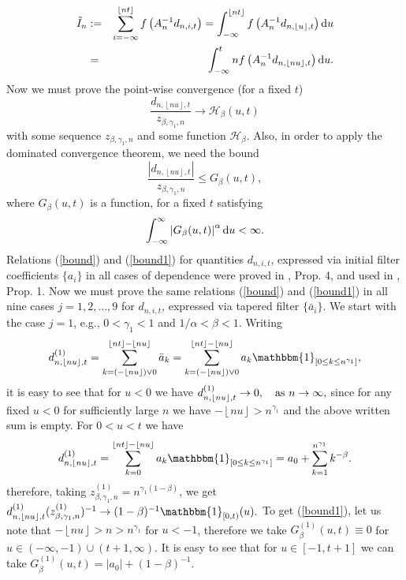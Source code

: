 \documentclass[12pt]{article}
\def\a{\alpha}
\def\b{\beta}
\def\g{\gamma}
\def\H{{\mathscr H}}
\newcommand{\dd}{{\rm d}}
\newcommand{\abs}[1]{\left|#1\right|}
\newcommand{\ind}[1]{\mathbbm{1}_{#1}}
\newcommand{\sv}[1]{\left\lfloor #1 \right\rfloor}
\theoremstyle{plain}
\theoremstyle{definition}
\begin{document}
\begin{eqnarray}\label{In1}
{\tilde I}_n &:=& \sum_{i=-\infty}^{\sv{nt}}f\left( A_{n}^{-1}d_{n, i, t}  \right)=\int_{-\infty}^{\sv{nt}}f\left( A_{n}^{-1}d_{n, \sv{u}, t}  \right)\dd u  \\ \nonumber
   &=& \int_{-\infty}^{t}n f\left( A_{n}^{-1}d_{n, \sv{nu}, t}  \right)\dd u.
\end{eqnarray}
Now we must prove the point-wise convergence (for a fixed $t$)
\begin{equation}\label{bound}
\frac{d_{n, \sv{nu}, t} }{z_{\b,\g_1, n}}\rightarrow \H_{\b}(u,t)
\end{equation}
with some sequence $z_{\b, \g_1, n}$ and some function $\H_\b$. Also, in order to apply the dominated convergence theorem, we need the bound
\begin{equation}\label{bound1}
\frac{|d_{n, \sv{nu}, t} |}{z_{\b, \g_1, n}}\leq  G_{\b}(u,t),
\end{equation}
where $G_{\b}(u,t)$ is a function, for a fixed $t$ satisfying
\begin{equation*}\label{integrableBound}
\int_{-\infty}^{\infty} \abs{G_{\b}(u,t)}^\a \dd u<\infty.
\end{equation*}
Relations (\ref{bound}) and (\ref{bound1}) for quantities $d_{n, i, t}$, expressed via initial filter coefficients $\{ a_i\}$ in all cases of dependence were proved in \cite{PaulDam3}, Prop. 4, and used in \cite{PaulDam5}, Prop. 1. Now we must prove the same relations (\ref{bound}) and (\ref{bound1}) in all nine cases $j=1, 2, \dots , 9$ for  $d_{n, i, t}$, expressed via tapered filter
$\{{\bar a}_i\}$.
We start with the case $j=1$,
 e.g., $0<\g_1<1$ and $1/\a<\b<1$. Writing
$$
d_{n, \sv{nu}, t}^{(1)} =\sum_{k=\left( -\sv{nu} \right)\vee 0 }^{\sv{nt}-\sv{nu}}{\bar a}_{k}=\sum_{k=\left( -\sv{nu} \right)\vee 0 }^{\sv{nt}-\sv{nu}} a_{k}\ind{[ 0\leq k \leq n^{\g_1}]},
$$
it is easy to see that for $u<0$ we have
$d_{n, \sv{nu}, t}^{(1)} \to 0, \quad {\rm as} \ n\to \infty,$
since for any fixed $u<0$ for sufficiently large $n$ we have $-\sv{nu}>n^{\g_1}$ and the above written sum is empty.
For $0<u<t$ we have
$$
d_{n, \sv{nu}, t}^{(1)}=\sum_{k= 0 }^{\sv{nt}-\sv{nu}} a_{k}\ind{[ 0\leq k \leq n^{\g_1}]}=a_0+\sum_{k=1}^{n^{\g_1}}k^{-\b}.
$$
therefore, taking $z_{\b, \g_1, n}^{(1)}=n^{\g_1(1-\b)}$, we get
$d_{n, \sv{nu}, t}^{(1)}(z_{\b, \g_1, n}^{(1)})^{-1}\rightarrow  (1-\b)^{-1}\ind{[0,t)}(u).$
To get (\ref{bound1}), let us note that $-\sv{nu}>n>n^{\g_1}$ for $u<-1$, therefore we take $G_{\b}^{(1)}(u,t)\equiv 0$ for $u\in (-\infty, -1)\cup (t+1, \infty)$. It is easy to see that for $u\in [-1, t+1]$ we can take $G_{\b}^{(1)}(u,t)=|a_0|+(1-\b)^{-1}$.
\end{document}
